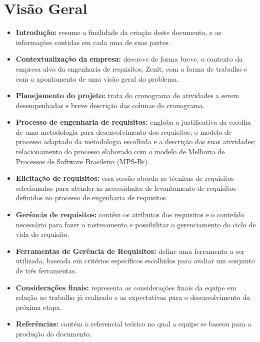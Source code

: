 \section{Visão Geral}
\begin{itemize}
\item \textbf{Introdução:} 
resume a finalidade da criação deste documento, e as informações contidas em cada uma de suas partes.
\item \textbf{Contextualização da empresa:} 
descreve de forma breve, o contexto da empresa alvo da engenharia de requisitos, Zenit, com a forma de trabalho e com o apontamento de uma visão geral do problema.
\item \textbf{Planejamento do projeto:} 
trata do cronograma de atividades a serem desempenhadas e breve descrição das colunas do cronograma.
\item \textbf{Processo de engenharia de requisitos:} 
engloba a justificativa da escolha de uma metodologia para desenvolvimento dos requisitos; o modelo de processo adaptado da metodologia escolhida e a descrição das suas atividades; relacionamento do processo elaborado com o modelo de Melhoria de Processos de Software Brasileiro (MPS-Br).
\item \textbf{Elicitação de requisitos:} 
essa sessão aborda as técnicas de requisitos selecionadas para atender as necessidades de levantamento de requisitos definidos no processo de engenharia de requisitos.
\item \textbf{Gerência de requisitos:} 
contém os atributos dos requisitos e o conteúdo necessário para fazer o rastreamento e possibilitar o gerenciamento do ciclo de vida do requisito.
\item \textbf{Ferramentas de Gerência de Requisitos:} 
define uma ferramenta a ser utilizada, baseada em critérios específicos escolhidos para avaliar um conjunto de três ferramentas.
\item \textbf{Considerações finais:} 
representa as considerações finais da equipe em relação ao trabalho já realizado e as expectativas para o desenvolvimento da próxima etapa.
\item \textbf{Referências:} 
contém o referencial teórico no qual a equipe se baseou para a produção do documento.
\end{itemize}
